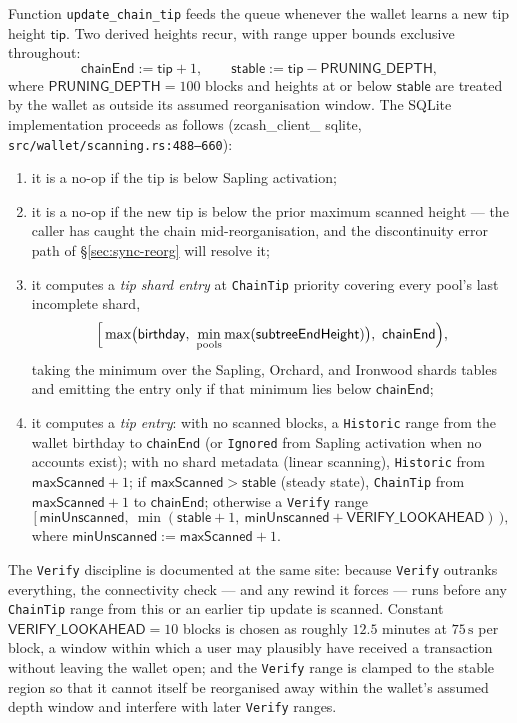 \documentclass[11pt,a4paper]{article}
\theoremstyle{definition}
\begin{document}
Function \texttt{update\_chain\_tip} feeds the queue whenever the wallet
learns a new tip height $\mathsf{tip}$. Two derived heights recur, with
range upper bounds exclusive throughout:
\[
\mathsf{chainEnd} := \mathsf{tip} + 1, \qquad
\mathsf{stable} := \mathsf{tip} - \mathsf{PRUNING\_DEPTH},
\]
where $\mathsf{PRUNING\_DEPTH} = 100$ blocks and heights at or below
$\mathsf{stable}$ are treated by the wallet as outside its assumed
reorganisation window. The SQLite
implementation
proceeds as follows (\textsf{zcash\_\allowbreak client\_\allowbreak
sqlite},
\texttt{src/\allowbreak wallet/\allowbreak scanning.rs:488--660}):
\begin{enumerate}[label=(\alph*)]
\item it is a no-op if the tip is below Sapling activation;
\item it is a no-op if the new tip is below the prior maximum scanned
  height --- the caller has caught the chain mid-reorganisation, and the
  discontinuity error path of \S\ref{sec:sync-reorg} will resolve it;
\item it computes a \emph{tip shard entry} at \texttt{ChainTip} priority
  covering every pool's last incomplete shard,
  \[
  \Bigl[\,\max\bigl(\mathsf{birthday},\
  \min_{\text{pools}} \max(\mathsf{subtreeEndHeight})\bigr),\
  \mathsf{chainEnd}\Bigr),
  \]
  taking the minimum over the Sapling, Orchard, and Ironwood shards tables
  and emitting the entry only if that minimum lies below
  $\mathsf{chainEnd}$;
\item it computes a \emph{tip entry}: with no scanned blocks, a
  \texttt{Historic} range from the wallet birthday to $\mathsf{chainEnd}$
  (or \texttt{Ignored} from Sapling activation when no accounts exist);
  with no shard metadata (linear scanning), \texttt{Historic} from
  $\mathsf{maxScanned} + 1$; if $\mathsf{maxScanned} > \mathsf{stable}$
  (steady state), \texttt{ChainTip} from $\mathsf{maxScanned} + 1$ to
  $\mathsf{chainEnd}$; otherwise a \texttt{Verify} range
  \[
  \bigl[\,\mathsf{minUnscanned},\
  \min(\mathsf{stable} + 1,\ \mathsf{minUnscanned} +
  \mathsf{VERIFY\_LOOKAHEAD})\,\bigr),
  \]
  where $\mathsf{minUnscanned} := \mathsf{maxScanned} + 1$.
\end{enumerate}

The \texttt{Verify} discipline is documented at the same site: because
\texttt{Verify} outranks everything, the connectivity check --- and any
rewind it forces --- runs before any \texttt{ChainTip} range from this or
an earlier tip update is scanned. Constant
$\mathsf{VERIFY\_LOOKAHEAD} = 10$ blocks is chosen as roughly $12.5$
minutes at $75\,\mathrm{s}$ per block, a window within which a user may
plausibly have received a transaction without leaving the wallet open; and
the \texttt{Verify} range is clamped to the stable region so that it cannot
itself be reorganised away within the wallet's assumed depth window and
interfere with later \texttt{Verify} ranges.
\end{document}
